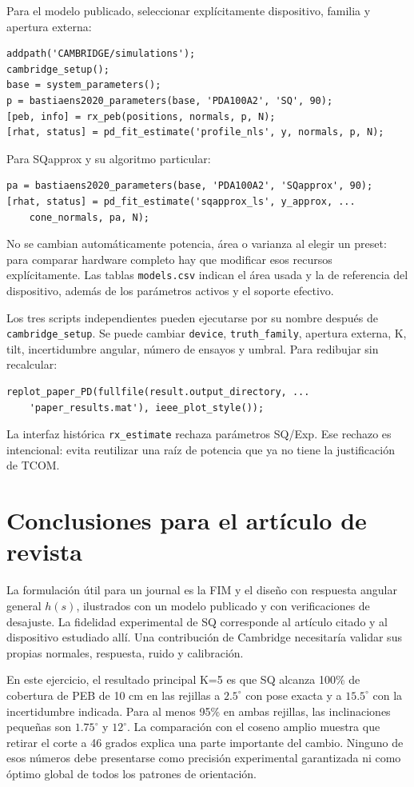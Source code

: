 \documentclass[11pt,a4paper]{article}
\begin{document}
Para el modelo publicado, seleccionar explícitamente dispositivo, familia y apertura externa:
\begin{verbatim}
addpath('CAMBRIDGE/simulations');
cambridge_setup();
base = system_parameters();
p = bastiaens2020_parameters(base, 'PDA100A2', 'SQ', 90);
[peb, info] = rx_peb(positions, normals, p, N);
[rhat, status] = pd_fit_estimate('profile_nls', y, normals, p, N);
\end{verbatim}
Para SQapprox y su algoritmo particular:
\begin{verbatim}
pa = bastiaens2020_parameters(base, 'PDA100A2', 'SQapprox', 90);
[rhat, status] = pd_fit_estimate('sqapprox_ls', y_approx, ...
    cone_normals, pa, N);
\end{verbatim}
No se cambian automáticamente potencia, área o varianza al elegir un preset: para comparar hardware completo hay que modificar esos recursos explícitamente. Las tablas \texttt{models.csv} indican el área usada y la de referencia del dispositivo, además de los parámetros activos y el soporte efectivo.

Los tres scripts independientes pueden ejecutarse por su nombre después de \texttt{cambridge\_setup}. Se puede cambiar \texttt{device}, \texttt{truth\_family}, apertura externa, K, tilt, incertidumbre angular, número de ensayos y umbral. Para redibujar sin recalcular:
\begin{verbatim}
replot_paper_PD(fullfile(result.output_directory, ...
    'paper_results.mat'), ieee_plot_style());
\end{verbatim}
La interfaz histórica \texttt{rx\_estimate} rechaza parámetros SQ/Exp. Ese rechazo es intencional: evita reutilizar una raíz de potencia que ya no tiene la justificación de TCOM.

\section{Conclusiones para el artículo de revista}
La formulación útil para un journal es la FIM y el diseño con respuesta angular general $h(s)$, ilustrados con un modelo publicado y con verificaciones de desajuste. La fidelidad experimental de SQ corresponde al artículo citado y al dispositivo estudiado allí. Una contribución de Cambridge necesitaría validar sus propias normales, respuesta, ruido y calibración.

En este ejercicio, el resultado principal K=5 es que SQ alcanza 100\% de cobertura de PEB de 10 cm en las rejillas a $2.5^\circ$ con pose exacta y a $15.5^\circ$ con la incertidumbre indicada. Para al menos 95\% en ambas rejillas, las inclinaciones pequeñas son $1.75^\circ$ y $12^\circ$. La comparación con el coseno amplio muestra que retirar el corte a 46 grados explica una parte importante del cambio. Ninguno de esos números debe presentarse como precisión experimental garantizada ni como óptimo global de todos los patrones de orientación.



\end{document}
